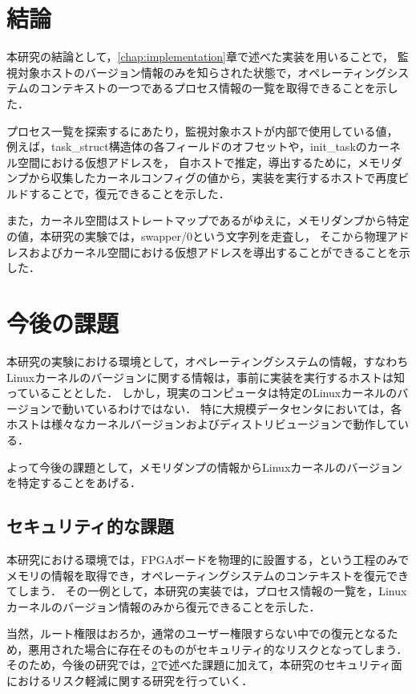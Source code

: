 \section{結論}

本研究の結論として，\ref{chap:implementation}章で述べた実装を用いることで，
監視対象ホストのバージョン情報のみを知らされた状態で，オペレーティングシステムのコンテキストの一つであるプロセス情報の一覧を取得できることを示した．

プロセス一覧を探索するにあたり，監視対象ホストが内部で使用している値，
例えば，task\_struct構造体の各フィールドのオフセットや，init\_taskのカーネル空間における仮想アドレスを，
自ホストで推定，導出するために，メモリダンプから収集したカーネルコンフィグの値から，実装を実行するホストで再度ビルドすることで，復元できることを示した．

また，カーネル空間はストレートマップであるがゆえに，メモリダンプから特定の値，本研究の実験では，swapper/0という文字列を走査し，
そこから物理アドレスおよびカーネル空間における仮想アドレスを導出することができることを示した．



\section{今後の課題}
\label{section:kongo}


本研究の実験における環境として，オペレーティングシステムの情報，すなわちLinuxカーネルのバージョンに関する情報は，事前に実装を実行するホストは知っていることとした．
しかし，現実のコンピュータは特定のLinuxカーネルのバージョンで動いているわけではない．
特に大規模データセンタにおいては，各ホストは様々なカーネルバージョンおよびディストリビュージョンで動作している．

よって今後の課題として，メモリダンプの情報からLinuxカーネルのバージョンを特定することをあげる．

\subsection{セキュリティ的な課題}

本研究における環境では，FPGAボードを物理的に設置する，という工程のみでメモリの情報を取得でき，オペレーティングシステムのコンテキストを復元できてしまう．
その一例として，本研究の実装では，プロセス情報の一覧を，Linuxカーネルのバージョン情報のみから復元できることを示した．

当然，ルート権限はおろか，通常のユーザー権限すらない中での復元となるため，悪用された場合に存在そのものがセキュリティ的なリスクとなってしまう．
そのため，今後の研究では，\ref{section:kongo}で述べた課題に加えて，本研究のセキュリティ面におけるリスク軽減に関する研究を行っていく．
